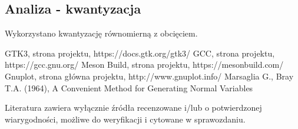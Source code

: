 \documentclass{article}
\begin{document}
\subsection{Analiza - kwantyzacja}
Wykorzystano kwantyzację równomierną z obcięciem.

\begin{thebibliography}{0}
 GTK3, strona projektu, https://docs.gtk.org/gtk3/
 GCC, strona projektu, https://gcc.gnu.org/  
 Meson Build, strona projektu, https://mesonbuild.com/
 Gnuplot, strona główna projektu, http://www.gnuplot.info/
 Marsaglia G., Bray T.A. (1964), A Convenient Method for Generating Normal Variables
\end{thebibliography}

Literatura zawiera wyłącznie źródła recenzowane i/lub o potwierdzonej wiarygodności,
możliwe do weryfikacji i cytowane w sprawozdaniu. 
\end{document}
